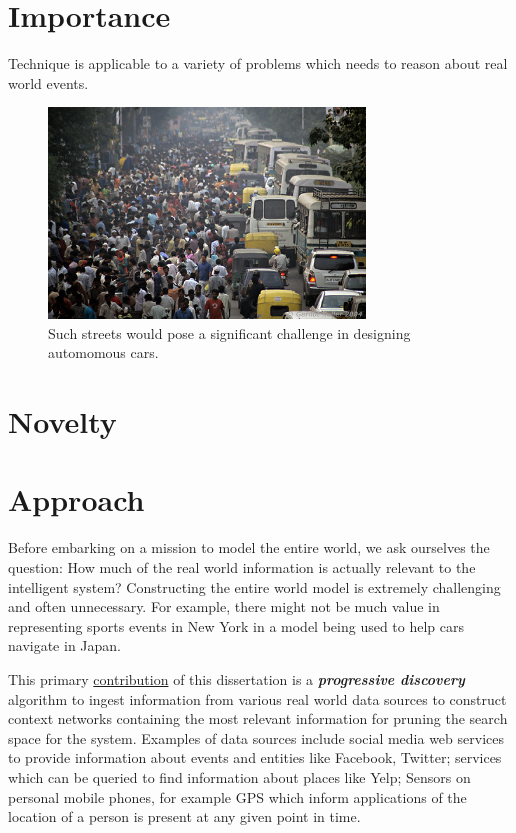 \section{Importance}

Technique is applicable to a variety of problems which needs to reason about real world events.

\begin{figure}[t]
\centering
\includegraphics[width=0.75\textwidth]{media/chapter1/india-streets.jpg}
\caption{Such streets would pose a significant challenge in designing automomous cars.}
\label{fig:india-streets}
\end{figure}


\section{Novelty}

\section{Approach}
Before embarking on a mission to model the entire world, we ask ourselves the question: How much of the real world information is actually relevant to the intelligent system? Constructing the entire world model is extremely challenging and often unnecessary. For example, there might not be much value in representing sports events in New York in a model being used to help cars navigate in Japan. 

This primary \uline{contribution} of this dissertation is a \textbf{\textit{progressive discovery}} algorithm to ingest information from various real world data sources to construct context networks containing the most relevant information for pruning the search space for the system. Examples of data sources include social media web services to provide information about events and entities like Facebook, Twitter; services which can be queried to find information about places like Yelp; Sensors on personal mobile phones, for example GPS which inform applications of the location of a person is present at any given point in time.

